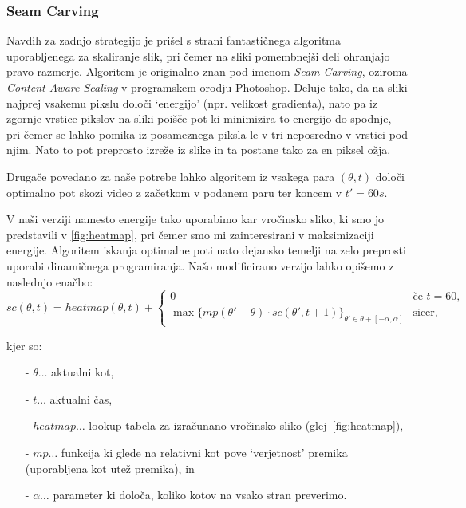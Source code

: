 \subsubsection{Seam Carving}
Navdih za zadnjo strategijo je prišel s strani fantastičnega algoritma
uporabljenega za skaliranje slik, pri čemer na sliki pomembnejši
deli ohranjajo pravo razmerje. Algoritem je originalno znan pod imenom
\textit{Seam Carving}\cite{seamcarving}, oziroma \textit{Content Aware Scaling}
v programskem orodju Photoshop. Deluje tako, da na sliki najprej vsakemu pikslu
določi `energijo' (npr. velikost gradienta), nato pa iz zgornje vrstice pikslov
na sliki poišče pot ki minimizira to energijo do spodnje, pri čemer se lahko
pomika iz posameznega piksla le v tri neposredno v vrstici pod njim. Nato to
pot preprosto izreže iz slike in ta postane tako za en piksel ožja.

Drugače povedano za naše potrebe lahko algoritem iz vsakega para $\left(\theta,
t\right)$ določi optimalno pot skozi video z začetkom v podanem paru ter koncem
v $t' = 60s$.

V naši verziji namesto energije tako uporabimo kar vročinsko sliko, ki smo jo
predstavili v \ref{fig:heatmap}, pri čemer smo mi zainteresirani v
maksimizaciji energije. Algoritem iskanja optimalne poti nato dejansko temelji
na zelo preprosti uporabi dinamičnega programiranja. Našo modificirano verzijo
lahko opišemo z naslednjo enačbo:
\begin{displaymath}
  sc(\theta, t) = heatmap(\theta, t) + \left\{ \begin{array}{ll}
                                            0 & \textrm{če $t = 60$,}\\
                                            \max\{mp(\theta'-\theta) \cdot sc(\theta', t+1)\}_{\theta' \in \theta + [-\alpha, \alpha]} & \textrm{sicer,}
  \end{array} \right.
\end{displaymath}

kjer so:
\begin{itemize}
  \item[-] $\theta \ldots$ aktualni kot,
  \item[-] $t \ldots$ aktualni čas,
  \item[-] $heatmap \ldots$ lookup tabela za izračunano vročinsko sliko (glej~\ref{fig:heatmap}),
  \item[-] $mp \ldots$ funkcija ki glede na relativni kot pove `verjetnost' premika (uporabljena kot utež premika), in
  \item[-] $\alpha \ldots$ parameter ki določa, koliko kotov na vsako stran preverimo.
\end{itemize}


